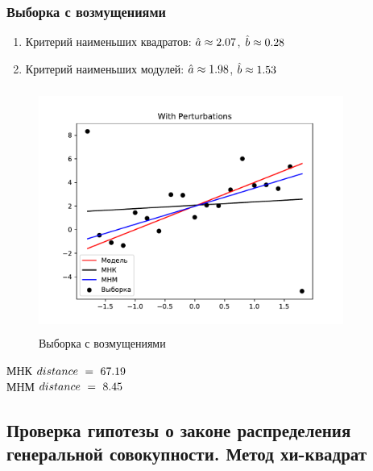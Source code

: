 \documentclass[a4paper]{article}
\begin{document}
            \subsubsection{Выборка с возмущениями}
                \begin{enumerate}
                    \item{Критерий наименьших квадратов:}
                    $\hat{a}\approx 2.07$, $\hat{b}\approx 0.28$
                    \item{Критерий наименьших модулей:}
                    $\hat{a}\approx 1.98$, $\hat{b}\approx 1.53$
                \end{enumerate}
                \begin{figure}[H]
                    \centering
                    \includegraphics[width = 10cm, height = 8cm]{src_lab_6/With Perturbations}
                    \caption{Выборка с возмущениями}
                    \label{with_pert}
                \end{figure}
                МНК$~distance~=~67.19$ \\
		        МНМ$~distance~=~8.45$
    \subsection{Проверка гипотезы о законе распределения генеральной совокупности. Метод хи-квадрат}
\end{document}
